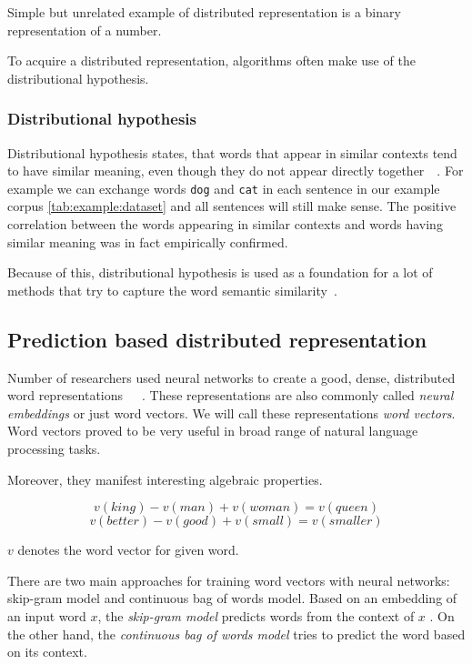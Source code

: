     Simple but unrelated example of distributed representation is a binary representation of a number.
    
    To acquire a distributed representation, algorithms often make use of the distributional hypothesis.

    \subsubsection{Distributional hypothesis}
    
    Distributional hypothesis states, that words that appear in similar contexts tend to have similar meaning,
    even though they do not appear directly together~\cite{harris1954distributional}~\cite{Rubenstein:1965:CCS:365628.365657}. %
    For example we can exchange words \texttt{dog} and \texttt{cat} in each sentence in our example corpus \ref{tab:example:dataset}
    and all sentences will still make sense. 
    The positive correlation between the words appearing in similar contexts and words having similar meaning was in fact empirically confirmed.
    
    Because of this, distributional hypothesis is used as a foundation for a lot of methods that try to capture the word semantic similarity~\cite{rubenstein1965contextual}. 

    \subsection{Prediction based distributed representation}
    
    Number of researchers used neural networks to create a good, dense, distributed word representations~\cite{pennington2014glove}~\cite{DBLP:conf/icml/LeM14}~\cite{rong2014word2vec}. %
    These representations are also commonly called \emph{neural embeddings} or just word vectors.
    We will call these representations \emph{word vectors}.
    Word vectors proved to be very useful in broad range of natural language processing tasks. 
    
    Moreover, they manifest interesting algebraic properties. 
    
    $$v(king) - v(man) + v(woman) = v(queen)$$
    $$v(better) - v(good) + v(small) = v(smaller)$$
    
    $v$ denotes the word vector for given word.
    
    There are two main approaches for training word vectors with neural networks: skip-gram model and continuous bag of words model.
    Based on an embedding of an input word $x$, the \textit{skip-gram model} predicts words from the context of $x$ .
    On the other hand, the \textit{continuous bag of words model} tries to predict the word based on its context.
    
